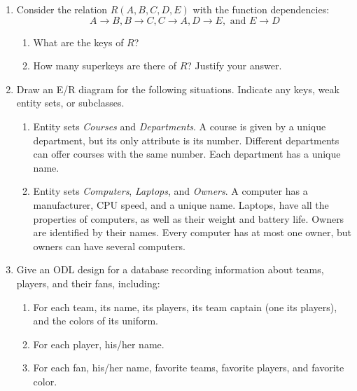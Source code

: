 {{\begin{enumerate}
\item Consider the relation $R(A,B,C,D,E)$ with the function
dependencies: 
$$
	A\rightarrow B,
	B\rightarrow C,
	C \rightarrow A,
	D \rightarrow E, \mbox{ and }
	E\rightarrow D
$$
\begin{enumerate}
    \item What are the keys of $R$?  
	\vspace{1in}
    \item How many superkeys are there of $R$?  Justify your answer.
	\vspace{1in}
\end{enumerate}

\newpage
\item Draw an E/R diagram for the following situations. Indicate any
keys, weak entity sets, or subclasses.
\begin{enumerate}
    \item Entity sets {\em Courses} and {\em Departments}.  A course
	is given by a unique department, but its only attribute is its
	number.  Different departments can offer courses with the same
	number.  Each department has a unique name.
	\vspace{3in}
    \item Entity sets {\em Computers}, {\em Laptops}, and {\em Owners}.
	A computer has a manufacturer, CPU speed, and a unique name.
	Laptops, have all the properties of computers, as well as their
	weight and battery life.  Owners are identified by their names.
	Every computer has at most one owner, but owners can have 
	several computers.
\end{enumerate}

\newpage
\item Give an ODL design for a database recording information about teams,
players, and their fans, including:
\begin{enumerate}
    \item For each team, its name, its players, its team captain (one its
	players), and the colors of its uniform.
    \item For each player, his/her name.
    \item For each fan, his/her name, favorite teams, favorite players,
	and favorite color.
\end{enumerate}


\end{enumerate}}}
